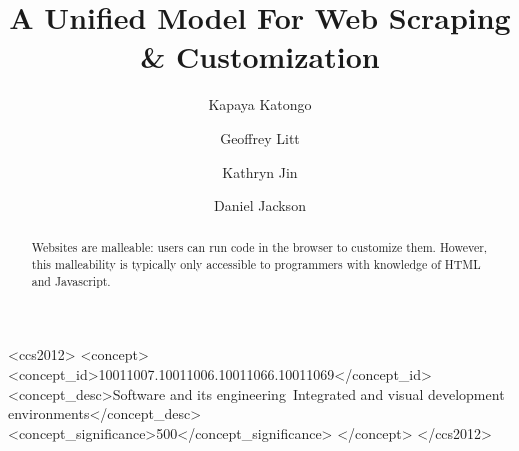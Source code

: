 \documentclass[sigconf,10pt]{acmart}
\begin{document}
\title{A Unified Model For Web Scraping \& Customization}


\author{Kapaya Katongo}

\author{Geoffrey Litt}

\author{Kathryn Jin}

\author{Daniel Jackson}


\begin{abstract}
  Websites are malleable: users can run code in the browser to customize
  them. However, this malleability is typically only accessible to
  programmers with knowledge of HTML and Javascript.
\end{abstract}

\begin{CCSXML}
<ccs2012>
<concept>
<concept_id>10011007.10011006.10011066.10011069</concept_id>
<concept_desc>Software and its engineering~Integrated and visual development environments</concept_desc>
<concept_significance>500</concept_significance>
</concept>
</ccs2012>
\end{CCSXML}
\end{document}
